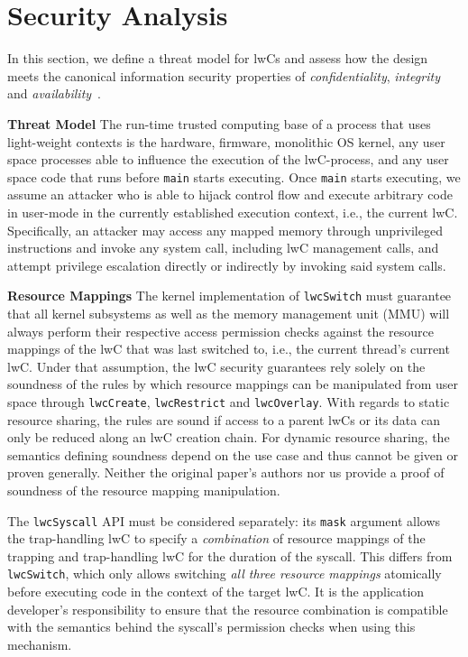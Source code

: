 \documentclass[10pt,twocolumn,a4paper]{article}
\begin{document}
\section{Security Analysis}\label{security}

In this section, we define a threat model for lwCs and assess how the design meets the canonical information security properties of \textit{confidentiality}, \textit{integrity} and \textit{availability}~\cite{ciagoals}.

\textbf{Threat Model}\hspace{1em}
The run-time trusted computing base of a process that uses light-weight contexts is the
hardware,
firmware,
monolithic OS kernel,
any user space processes able to influence the execution of the lwC-process,
and any user space code that runs before \lstinline{main} starts executing.
Once \lstinline{main} starts executing, we assume an attacker who is able to hijack control flow and execute arbitrary code in user-mode in the currently established execution context, i.e., the current lwC.
Specifically, an attacker may access any mapped memory through unprivileged instructions and invoke any system call, including lwC management calls, and attempt privilege escalation directly or indirectly by invoking said system calls.
\cite{lwcpaper}

\textbf{Resource Mappings}\hspace{1em}
The kernel implementation of \texttt{lwcSwitch} must guarantee that all kernel subsystems as well as the memory management unit (MMU) will always perform their respective access permission checks against the resource mappings of the lwC that was last switched to, i.e., the current thread's current lwC.
Under that assumption, the lwC security guarantees rely solely on the soundness of the rules by which resource mappings can be manipulated from user space through \lstinline{lwcCreate}, \lstinline{lwcRestrict} and \lstinline{lwcOverlay}.
With regards to static resource sharing, the rules are sound if access to a parent lwCs or its data can only be reduced along an lwC creation chain.
For dynamic resource sharing, the semantics defining soundness depend on the use case and thus cannot be given or proven generally.
Neither the original paper's authors nor us provide a proof of soundness of the resource mapping manipulation.

The \lstinline{lwcSyscall} API must be considered separately:
its \lstinline{mask} argument allows the trap-handling lwC to specify a \textit{combination} of resource mappings of the trapping and trap-handling lwC for the duration of the syscall.
This differs from \lstinline{lwcSwitch}, which only allows switching \textit{all three resource mappings} atomically before executing code in the context of the target lwC.
It is the application developer's responsibility to ensure that the resource combination is compatible with the semantics behind the syscall's permission checks when using this mechanism.
\end{document}
